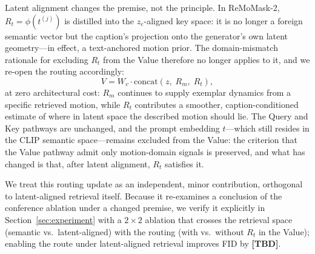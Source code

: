 Latent alignment changes the premise, not the principle. In ReMoMask-2, $R_t = \phi(t^{(j)})$ is distilled into the $z_e$-aligned key space: it is no longer a foreign semantic vector but the caption's projection onto the generator's own latent geometry---in effect, a text-anchored motion prior. The domain-mismatch rationale for excluding $R_t$ from the Value therefore no longer applies to it, and we re-open the routing accordingly:
\begin{equation}
V = W_v \cdot
\mathrm{concat}\!\left(z,\; R_m,\; R_t\right),
\end{equation}
at zero architectural cost: $R_m$ continues to supply exemplar dynamics from a specific retrieved motion, while $R_t$ contributes a smoother, caption-conditioned estimate of where in latent space the described motion should lie. The Query and Key pathways are unchanged, and the prompt embedding $t$---which still resides in the CLIP semantic space---remains excluded from the Value: the criterion that the Value pathway admit only motion-domain signals is preserved, and what has changed is that, after latent alignment, $R_t$ satisfies it.

We treat this routing update as an independent, minor contribution, orthogonal to latent-aligned retrieval itself. Because it re-examines a conclusion of the conference ablation under a changed premise, we verify it explicitly in Section~\ref{sec:experiment} with a $2{\times}2$ ablation that crosses the retrieval space (semantic vs.\ latent-aligned) with the routing (with vs.\ without $R_t$ in the Value); enabling the route under latent-aligned retrieval improves FID by \textbf{[TBD]}.
